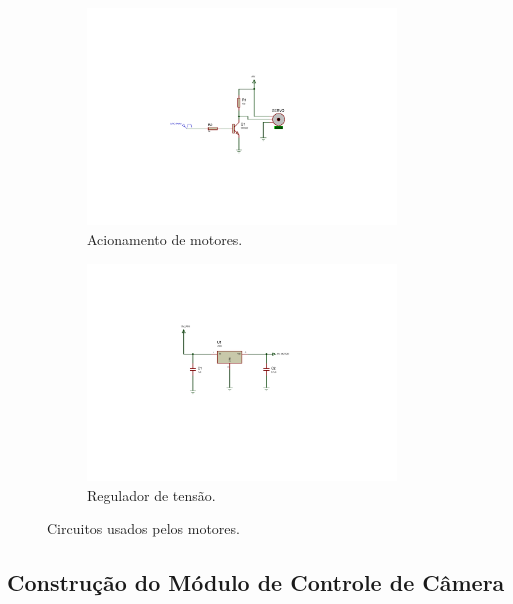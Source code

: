 \begin{figure}[H]
	\centering
	\begin{subfigure}{.5\textwidth}
		\includegraphics[trim={6.5cm 5cm 9cm 5cm},clip,width=0.9\textwidth]{figuras/circ_acionamento.pdf}
		\caption{Acionamento de motores.}
		\label{fig:circprotecao}
	\end{subfigure}%
	\begin{subfigure}{.5\textwidth}
		\includegraphics[trim={6.5cm 5cm 8.5cm 4cm},clip,width=0.9\textwidth]{figuras/fonte_motores.pdf}
		\caption{Regulador de tensão.}
		\label{fig:circfonte}
	\end{subfigure}
	\caption{Circuitos usados pelos motores.}
\end{figure}

\subsection{Construção do Módulo de Controle de Câmera}
\label{subsec:assemmodconcam}

